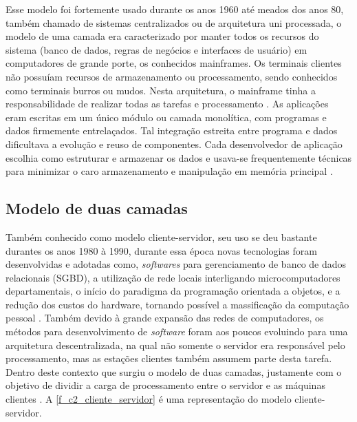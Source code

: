 Esse modelo foi fortemente usado durante os anos 1960 até meados dos anos 80, também chamado de sistemas centralizados ou de arquitetura uni processada, o modelo de uma camada era caracterizado por manter todos os recursos do sistema (banco de dados, regras de negócios e interfaces de usuário) em computadores de grande porte, os conhecidos mainframes. Os terminais clientes não possuíam recursos de armazenamento ou processamento, sendo conhecidos como terminais burros ou mudos. Nesta arquitetura, o mainframe tinha a responsabilidade de realizar todas as tarefas e processamento \cite{devmediaMultiCamada2018}. As aplicações eram escritas em um único módulo ou camada monolítica, com programas e dados firmemente entrelaçados. Tal integração estreita entre programa e dados dificultava a evolução e reuso de componentes. Cada desenvolvedor de aplicação escolhia como estruturar e armazenar os dados e usava-se frequentemente técnicas para minimizar o caro armazenamento e manipulação em memória principal \cite{devmediaMultiCamadaP12018}.


\subsection{Modelo de duas camadas}

Também conhecido como modelo cliente-servidor, seu uso se deu bastante durantes os anos 1980 à 1990, durante essa época novas tecnologias foram desenvolvidas e adotadas como, \textit{softwares} para gerenciamento de banco de dados relacionais (SGBD), a utilização de rede locais interligando microcomputadores departamentais, o início do paradigma da programação orientada a objetos, e a redução dos custos do hardware, tornando possível a massificação da computação pessoal \cite{devmediaMultiCamadaP12018}. Também devido à grande expansão das redes de computadores, os métodos para desenvolvimento de \textit{software} foram aos poucos evoluindo para uma arquitetura descentralizada, na qual não somente o servidor era responsável pelo processamento, mas as estações clientes também assumem parte desta tarefa. Dentro deste contexto que surgiu o modelo de duas camadas, justamente com o objetivo de dividir a carga de processamento entre o servidor e as máquinas clientes \cite{devmediaMultiCamada2018}. A \autoref{f_c2_cliente_servidor}  é uma representação do modelo cliente-servidor.


